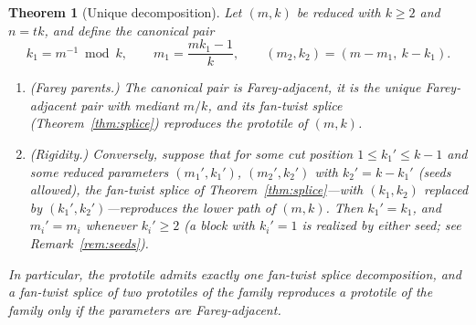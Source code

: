\documentclass[11pt]{article}
\newtheorem{theorem}{Theorem}[section]
\theoremstyle{remark}
\theoremstyle{definition}
\begin{document}
\begin{theorem}[Unique decomposition]\label{thm:decompose}
Let $(m,k)$ be reduced with $k\ge2$ and $n=tk$, and define the \emph{canonical pair}
\[
k_1 = m^{-1} \bmod k, \qquad m_1 = \frac{mk_1-1}{k}, \qquad
(m_2,k_2)=(m-m_1,\ k-k_1).
\]
\begin{enumerate}
\item[\emph{(1)}] \emph{(Farey parents.)} The canonical pair is Farey-adjacent, it is
the unique Farey-adjacent pair with mediant $m/k$, and its fan-twist splice
(Theorem~\ref{thm:splice}) reproduces the prototile of $(m,k)$.
\item[\emph{(2)}] \emph{(Rigidity.)} Conversely, suppose that for some cut position
$1\le k_1'\le k-1$ and some reduced parameters $(m_1',k_1')$, $(m_2',k_2')$ with
$k_2'=k-k_1'$ (seeds allowed), the fan-twist splice of Theorem~\ref{thm:splice}---with
$(k_1,k_2)$ replaced by $(k_1',k_2')$---reproduces the lower path of $(m,k)$. Then
$k_1'=k_1$, and $m_i'=m_i$ whenever $k_i'\ge2$ (a block with $k_i'=1$ is realized by
either seed; see Remark~\ref{rem:seeds}).
\end{enumerate}
In particular, the prototile admits exactly one fan-twist splice decomposition, and a
fan-twist splice of two prototiles of the family reproduces a prototile of the family
\emph{only if} the parameters are Farey-adjacent.
\end{theorem}
\end{document}

